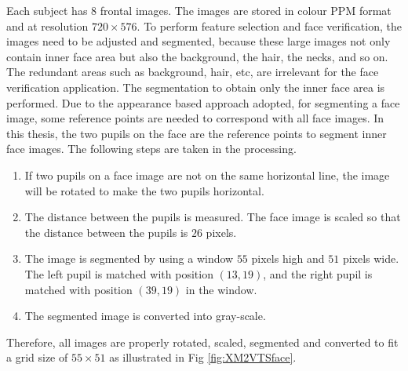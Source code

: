 Each subject has $8$ frontal images. The images are stored in colour PPM format \cite{ wiki:ppm} and at resolution $720\times576$. To perform feature selection and face verification, the images need to be adjusted and segmented, because these large images not only contain inner face area but also the background, the hair, the necks, and so on. The redundant areas such as background, hair, etc, are irrelevant for the face verification application. The segmentation to obtain only the inner face area is performed. Due to the appearance based approach adopted, for segmenting a face image, some reference points are needed to correspond with all face images. In this thesis, the two pupils on the face are the reference points to segment inner face images. The following steps are taken in the processing.
\begin{enumerate}
 \item If two pupils on a face image are not on the same horizontal line, the image will be rotated to make the two pupils horizontal.
 \item The distance between the pupils is measured. The face image is scaled so that the distance between the pupils is $26$ pixels.
 \item The image is segmented by using a window $55$ pixels high and $51$ pixels wide. The left pupil is matched with position $(13,19)$, and the right pupil is matched with position $(39,19)$ in the window.
 \item The segmented image is converted into gray-scale.
\end{enumerate}
Therefore, all images are properly rotated, scaled, segmented and converted to fit a grid size of $55\times51$ as illustrated in \mbox{Fig} \ref{fig:XM2VTSface}.
